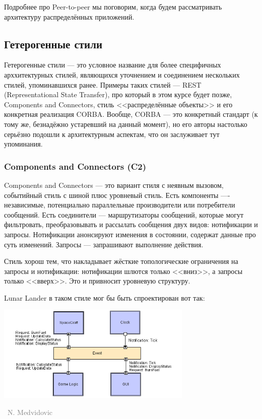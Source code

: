\documentclass[a5paper]{article}
\newcommand{\attribution}[1] {
    \vspace{-4mm}\begin{flushright}\begin{scriptsize}\textcolor{gray}
    {\textcopyright\, #1}\end{scriptsize}\end{flushright}
}
\begin{document}
Подробнее про Peer-to-peer мы поговорим, когда будем рассматривать архитектуру распределённых приложений.

\subsection{Гетерогенные стили}

Гетерогенные стили --- это условное название для более специфичных арххитектурных стилей, являющихся уточнением и соединением нескольких стилей, упоминавшихся ранее. Примеры таких стилей --- REST (Representational State Transfer), про который в этом курсе будет позже, Components and Connectors, стиль <<распределённые объекты>> и его конкретная реализация CORBA. Вообще, CORBA --- это конкретный стандарт (к тому же, безнадёжно устаревший на данный момент), но его авторы настолько серьёзно подошли к архитектурным аспектам, что он заслуживает тут упоминания.

\subsubsection{Components and Connectors (C2)}

Components and Connectors --- это вариант стиля с неявным вызовом, событийный стиль с шиной  плюс уровневый стиль. Есть компоненты ---- независимые, потенциально параллельные производители или потребители сообщений. Есть соединители ---  маршрутизаторы сообщений, которые могут фильтровать, преобразовывать и рассылать сообщения двух видов: нотификации и запросы. Нотификации анонсируют изменения в состоянии, содержат данные про суть изменений. Запросы --- запрашивают выполнение действия.

Стиль хорош тем, что накладывает жёсткие топологические ограничения на запросы и нотификации: нотификации шлются только <<вниз>>, а запросы только <<вверх>>. Это и привносит уровневую структуру.

Lunar Lander в таком стиле мог бы быть спроектирован вот так:

\begin{center}
    \includegraphics[width=0.7\textwidth]{c2LL.png}
    \attribution{N. Medvidovic}
\end{center}
\end{document}

